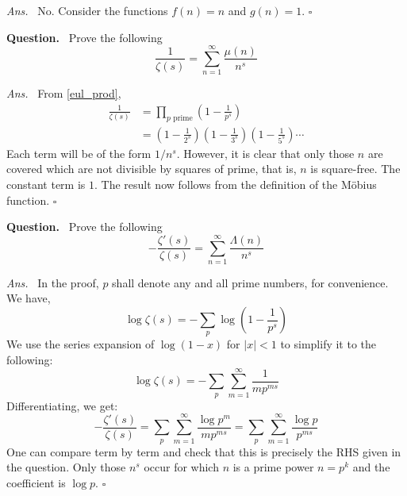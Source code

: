 \documentclass[10pt,openany]{book}
\theoremstyle{italicnonumber}
\theoremstyle{definition}
\newenvironment{question}{\par\vspace{1ex}\noindent\textbf{Question.}\ }{\par}
\newenvironment{answer}{\par\noindent\emph{Ans.}\ }{\hfill$\square$\par\vspace{1ex}}
\begin{document}
\begin{answer}
  No. Consider the functions $f(n)=n$ and $g(n)=1$.
\end{answer}

\begin{question}
  Prove the following
  \[
  \frac{1}{\zeta(s)} = \sum_{n=1}^\infty \frac{\mu(n)}{n^s}
  \]
\end{question}

\begin{answer}
  From \cref{eul_prod},
  \[
  \begin{aligned}
    \frac{1}{\zeta(s)}  & = \prod_{p \text{ prime}} \left( 1 - \frac{1}{p^s} \right) \\
    & = \left( 1- \frac{1}{2^s} \right)\left( 1- \frac{1}{3^s} \right)\left( 1- \frac{1}{5^s} \right) \cdots
  \end{aligned}
  \]
  Each term will be of the form $1/n^s$. However, it is clear that only those $n$ are covered which are not divisible by squares of prime, that is, $n$ is square-free. The constant term is $1$. The result now follows from the definition of the Möbius function.
\end{answer}

\begin{question}
  Prove the following
  \[
  -\frac{\zeta'(s)}{\zeta(s)} = \sum_{n=1}^\infty \frac{\Lambda(n)}{n^s}
  \]
\end{question}

\begin{answer}
  In the proof, $p$ shall denote any and all prime numbers, for convenience. We have,
  \[
  \log{\zeta(s)} = - \sum_p \log{\left( 1-\frac{1}{p^s} \right)}
  \]
  We use the series expansion of $\log(1-x)$ for $|x|<1$ to simplify it to the following:
  \[
  \log{\zeta(s)} = - \sum_p \sum_{m=1}^\infty \frac{1}{mp^{ms}}
  \]
  Differentiating, we get:
  \[
  - \frac{\zeta'(s)}{\zeta(s)} = \sum_p \sum_{m=1}^\infty \frac{\log{p^m}}{mp^{ms}} = \sum_p \sum_{m=1}^\infty \frac{\log{p}}{p^{ms}}
  \]
  One can compare term by term and check that this is precisely the RHS given in the question. Only those $n^s$ occur for which $n$ is a prime power $n=p^k$ and the coefficient is $\log{p}$.
\end{answer}
\end{document}
